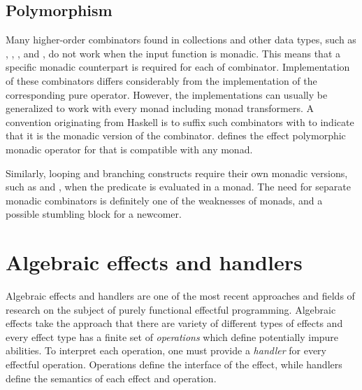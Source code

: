 


\subsection{Polymorphism}
Many higher-order combinators found in collections and other data types, such as , , , and , do not work when the input function is monadic. This means that a specific monadic counterpart is required for each of combinator. Implementation of these combinators differs considerably from the implementation of the corresponding pure operator. However, the implementations can usually be generalized to work with every monad including monad transformers. A convention originating from Haskell is to suffix such combinators with  to indicate that it is the monadic version of the combinator.  defines the effect polymorphic monadic  operator for  that is compatible with any monad.



Similarly, looping and branching constructs require their own monadic versions, such as  and , when the predicate is evaluated in a monad. The need for separate monadic combinators is definitely one of the weaknesses of monads, and a possible stumbling block for a newcomer.




\section{Algebraic effects and handlers} \label{algebraic-effects}
Algebraic effects and handlers are one of the most recent approaches and fields of research on the subject of purely functional effectful programming. Algebraic effects take the approach that there are variety of different types of effects and every effect type has a finite set of \emph{operations} which define potentially impure abilities. To interpret each operation, one must provide a \emph{handler} for every effectful operation. Operations define the interface of the effect, while handlers define the semantics of each effect and operation.

